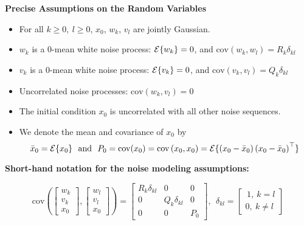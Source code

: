 \documentclass[letterpaper]{article}
\newcommand{\cov}{\mathrm{cov}}
\newcommand{\Expectof}[1]{{\cal E} \{ #1 \}}
\newcommand{\Covof}[2]{ \mathrm{cov} \left(#1,#2\right)}
\begin{document}
\noindent \textbf{Precise Assumptions on the Random Variables}~
\begin{itemize}
\setlength{\itemsep}{.5cm}
\item  For all $k\ge 0,~l\ge 0$, $x_0$, $w_k$, $v_l$ are jointly Gaussian.

\item $w_k$ is a 0-mean white noise process: $\Expectof{w_k}=0$, and $\Covof{w_k}{w_l}= R_k \delta_{kl}$

\item $v_k$ is a 0-mean white noise process: $\Expectof{v_k}=0$, and $\Covof{v_k}{v_l}= Q_k \delta_{kl}$

\item Uncorrelated noise processes: $\Covof{w_k}{v_l} = 0$

\item The initial condition $x_0$ is uncorrelated with all other noise sequences.

\item We denote the mean and covariance of $x_0$ by
$$\bar{x}_0 = \Expectof{x_0}~~\mbox{and}~~ P_0 = \cov(x_0)=\Covof{x_0}{x_0}= \Expectof{ \left(x_0-\bar{x}_0\right) \left(x_0-\bar{x}_0\right)^\top }$$

\end{itemize}

\newpage

\textbf{Short-hand notation for the noise modeling assumptions:}

$$\Covof{ \left[ \begin{array}{c} w_k\\ v_k \\ x_0 \end{array}  \right]} { \left[ \begin{array}{c} w_l\\ v_l \\ x_0 \end{array}  \right] } =
 \left[ \begin{array}{ccc} R_k \delta_{kl} & 0 &0 \\ 0 & Q_k \delta_{kl} & 0\\ 0 & 0& P_0 \end{array}  \right],~~\delta_{kl}=\begin{bmatrix}\, 1,~k=l \\0,~k\not= l \end{bmatrix}$$\\
\end{document}
